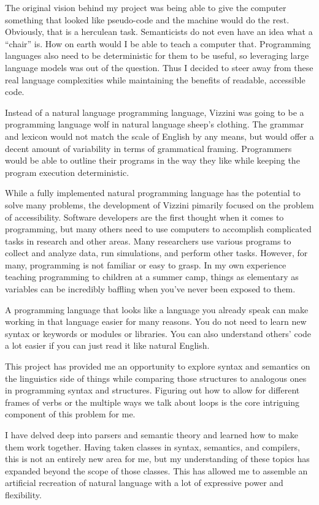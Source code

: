 \documentclass[titlepage]{article}
\newcommand{\langName}{Vizzini}
\begin{document}
The original vision behind my project was being able to give the computer something that looked like pseudo-code and the machine would do the rest. Obviously, that is a herculean task. Semanticists do not even have an idea what a “chair” is. How on earth would I be able to teach a computer that. Programming languages also need to be deterministic for them to be useful, so leveraging large language models was out of the question. Thus I decided to steer away from these real language complexities while maintaining the benefits of readable, accessible code.

Instead of a natural language programming language, \langName{} was going to be a programming language wolf in natural language sheep's clothing. The grammar and lexicon would not match the scale of English by any means, but would offer a decent amount of variability in terms of grammatical framing. Programmers would be able to outline their programs in the way they like while keeping the program execution deterministic.

While a fully implemented natural programming language has the potential to solve many problems, the development of \langName{} pimarily focused on the problem of accessibility. Software developers are the first thought when it comes to programming, but many others need to use computers to accomplish complicated tasks in research and other areas. Many researchers use various programs to collect and analyze data, run simulations, and perform other tasks. However, for many, programming is not familiar or easy to grasp. In my own experience teaching programming to children at a summer camp, things as elementary as variables can be incredibly baffling when you've never been exposed to them.

A programming language that looks like a language you already speak can make working in that language easier for many reasons. You do not need to learn new syntax or keywords or modules or libraries. You can also understand others' code a lot easier if you can just read it like natural English.

This project has provided me an opportunity to explore syntax and semantics on the linguistics side of things while comparing those structures to analogous ones in programming syntax and structures. Figuring out how to allow for different frames of verbs or the multiple ways we talk about loops is the core intriguing component of this problem for me.

I have delved deep into parsers and semantic theory and learned how to make them work together. Having taken classes in syntax, semantics, and compilers, this is not an entirely new area for me, but my understanding of these topics has expanded beyond the scope of those classes. This has allowed me to assemble an artificial recreation of natural language with a lot of expressive power and flexibility.
\end{document}
